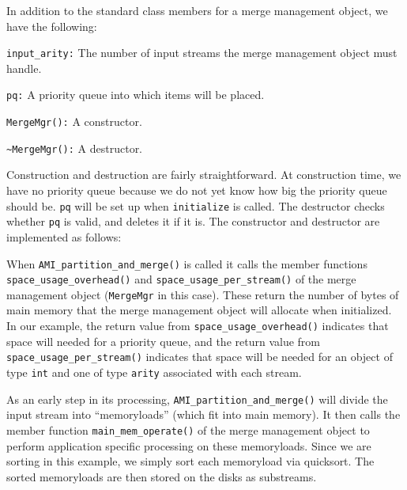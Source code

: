 


In addition to the standard class members for a merge management
object, we have the following:

\begin{description}
    \item\lstinline|input_arity:| The number of input streams
    the merge management object must handle.
    \item\lstinline|pq:| A priority queue into which items
    will be placed.
    \item\lstinline|MergeMgr():| A constructor.
    \item\lstinline|~MergeMgr():| A destructor.
\end{description}

Construction and destruction are fairly straightforward.  At
construction time, we have no priority queue because we do not yet
know how big the priority queue should be.  \lstinline|pq| will be set
up when \lstinline|initialize| is called.  The destructor checks
whether \lstinline|pq| is valid, and deletes it if it is.  The
constructor and destructor are implemented as follows:



When \lstinline|AMI_partition_and_merge()| is called it calls the
member functions \lstinline|space_usage_overhead()| and
\lstinline|space_usage_per_stream()| of the merge management object
(\lstinline|MergeMgr| in this case).  These return the number of bytes
of main memory that the merge management object will allocate when
initialized.  In our example, the return value from
\lstinline|space_usage_overhead()| indicates that space will needed
for a priority queue, and the return value from
\lstinline|space_usage_per_stream()| indicates that space
will be needed for an object of type \lstinline|int| and one of
type \lstinline|arity| associated with each stream.



As an early step in its processing,
\lstinline|AMI_partition_and_merge()| will divide the input stream
into ``memoryloads'' (which fit into main memory). It then calls the
member function \lstinline|main_mem_operate()| of the merge management
object to perform application specific processing on these
memoryloads.  Since we are sorting in this example, we simply sort
each memoryload via quicksort. The sorted memoryloads are then stored
on the disks as substreams.

